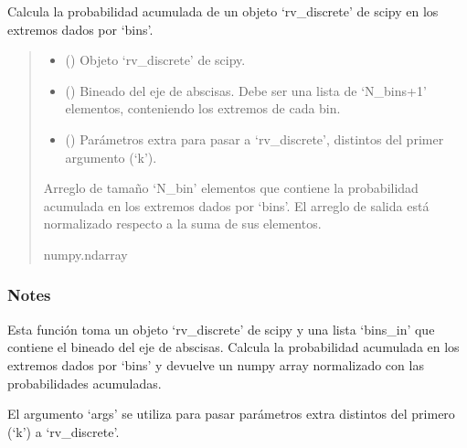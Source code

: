 \documentclass[letterpaper,10pt,english]{sphinxmanual}
\begin{document}

\begin{fulllineitems}
\label{\detokenize{myutils:myutils.stats.bin_rv_discrete}}
\pysigstartsignatures
{}
\pysigstopsignatures
\sphinxAtStartPar
Calcula la probabilidad acumulada de un objeto ‘rv\_discrete’ de scipy en los extremos dados por ‘bins’.
\begin{quote}\begin{description}
\begin{itemize}
\item {} 
\sphinxAtStartPar
{} () \textendash{} Objeto ‘rv\_discrete’ de scipy.

\item {} 
\sphinxAtStartPar
{} () \textendash{} Bineado del eje de abscisas. Debe ser una lista de ‘N\_bins+1’ elementos, conteniendo los extremos de cada bin.

\item {} 
\sphinxAtStartPar
{} (\sphinxstyleliteralemphasis{\sphinxupquote{, }}) \textendash{} Parámetros extra para pasar a ‘rv\_discrete’, distintos del primer argumento (‘k’).

\end{itemize}

\sphinxAtStartPar
Arreglo de tamaño ‘N\_bin’ elementos que contiene la probabilidad acumulada en los extremos dados por ‘bins’.
El arreglo de salida está normalizado respecto a la suma de sus elementos.

\sphinxAtStartPar
numpy.ndarray

\end{description}\end{quote}
\subsubsection*{Notes}

\sphinxAtStartPar
Esta función toma un objeto ‘rv\_discrete’ de scipy y una lista ‘bins\_in’ que contiene el bineado del eje de abscisas.
Calcula la probabilidad acumulada en los extremos dados por ‘bins’ y devuelve un numpy array normalizado con las probabilidades acumuladas.

\sphinxAtStartPar
El argumento ‘args’ se utiliza para pasar parámetros extra distintos del primero (‘k’) a ‘rv\_discrete’.

\end{fulllineitems}
\end{document}

